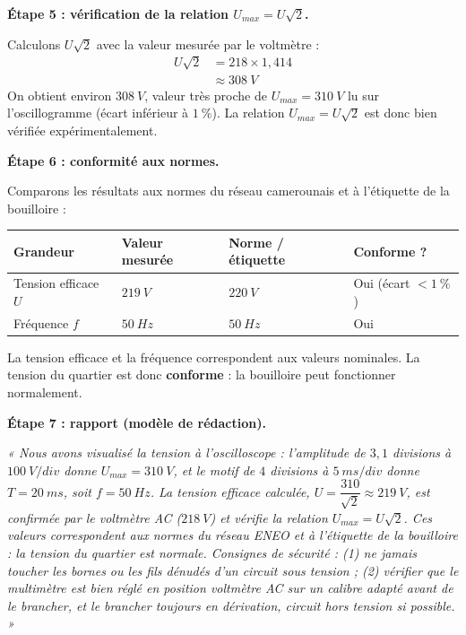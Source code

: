 \documentclass[11pt]{article}
\begin{document}
\begin{exoresolu}
\textbf{Étape 5 : vérification de la relation $U_{max} = U\sqrt{2}$.}

Calculons $U\sqrt{2}$ avec la valeur mesurée par le voltmètre :
\begin{align*}
U\sqrt{2} &= 218 \times 1,414 \\
&\approx \SI{308}{V}
\end{align*}
On obtient environ $\SI{308}{V}$, valeur très proche de $U_{max} = \SI{310}{V}$ lu sur l'oscillogramme (écart inférieur à $1\ \%$). La relation $U_{max} = U\sqrt{2}$ est donc bien vérifiée expérimentalement.

\textbf{Étape 6 : conformité aux normes.}

Comparons les résultats aux normes du réseau camerounais et à l'étiquette de la bouilloire :
\begin{center}
\begin{tabularx}{\linewidth}{|l|X|X|X|}
\hline
\rowcolor{popblueL} \textbf{Grandeur} & \textbf{Valeur mesurée} & \textbf{Norme / étiquette} & \textbf{Conforme ?} \\
\hline
Tension efficace $U$ & $\SI{219}{V}$ & $\SI{220}{V}$ & Oui (écart $< 1\ \%$) \\
\hline
Fréquence $f$ & $\SI{50}{Hz}$ & $\SI{50}{Hz}$ & Oui \\
\hline
\end{tabularx}
\end{center}
La tension efficace et la fréquence correspondent aux valeurs nominales. La tension du quartier est donc \textbf{conforme} : la bouilloire peut fonctionner normalement.

\textbf{Étape 7 : rapport (modèle de rédaction).}

\emph{« Nous avons visualisé la tension à l'oscilloscope : l'amplitude de $3,1$ divisions à $\SI{100}{V/div}$ donne $U_{max} = \SI{310}{V}$, et le motif de $4$ divisions à $\SI{5}{ms/div}$ donne $T = \SI{20}{ms}$, soit $f = \SI{50}{Hz}$. La tension efficace calculée, $U = \dfrac{310}{\sqrt{2}} \approx \SI{219}{V}$, est confirmée par le voltmètre AC ($\SI{218}{V}$) et vérifie la relation $U_{max} = U\sqrt{2}$. Ces valeurs correspondent aux normes du réseau ENEO et à l'étiquette de la bouilloire : la tension du quartier est normale. Consignes de sécurité : (1) ne jamais toucher les bornes ou les fils dénudés d'un circuit sous tension ; (2) vérifier que le multimètre est bien réglé en position voltmètre AC sur un calibre adapté avant de le brancher, et le brancher toujours en dérivation, circuit hors tension si possible. »}
\end{exoresolu}
\end{document}
